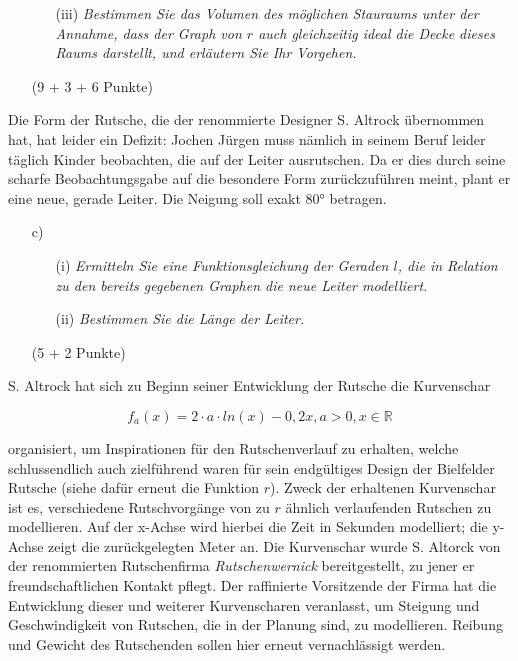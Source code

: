 \documentclass[ngerman, a4paper, 11pt]{article}
\begin{document}
\begin{enumerate}[resume]
    \item[]
        \begin{enumerate}[resume]
            \item[(iii)]
                \textit{Bestimmen Sie das Volumen des möglichen Stauraums unter der Annahme,
                dass der Graph von $r$ auch gleichzeitig ideal die Decke dieses Raums darstellt,
                und erläutern Sie Ihr Vorgehen.}
        \end{enumerate}
        \begin{flushright}
            (9 + 3 + 6 Punkte)
        \end{flushright}
\end{enumerate}

Die Form der Rutsche, die der renommierte Designer S. Altrock übernommen hat, hat leider ein Defizit:
Jochen Jürgen muss nämlich in seinem Beruf leider täglich Kinder beobachten, die auf der Leiter ausrutschen.
Da er dies durch seine scharfe Beobachtungsgabe auf die besondere Form zurückzuführen meint, plant er eine neue, gerade Leiter.
Die Neigung soll exakt 80° betragen.

\begin{enumerate}[resume]
    \item[c)]
        \begin{enumerate}
            \item[(i)]
                \textit{Ermitteln Sie eine Funktionsgleichung der Geraden $l$,
                die in Relation zu den bereits gegebenen Graphen die neue Leiter modelliert.}
            \item[(ii)]
                \textit{Bestimmen Sie die Länge der Leiter.}
        \end{enumerate}
        \begin{flushright}
            (5 + 2 Punkte)
        \end{flushright}
\end{enumerate}

S. Altrock hat sich zu Beginn seiner Entwicklung der Rutsche die Kurvenschar

$$f_{a}(x)=2\cdot a\cdot ln(x)-0,2x,a>0,x\in \mathbb{R}$$

organisiert, um Inspirationen für den Rutschenverlauf zu erhalten, welche schlussendlich auch zielführend waren für sein endgültiges Design der Bielfelder Rutsche (siehe dafür erneut die Funktion $r$). Zweck der erhaltenen Kurvenschar ist es, verschiedene Rutschvorgänge von zu $r$ ähnlich verlaufenden Rutschen zu modellieren. Auf der x-Achse wird hierbei die Zeit in Sekunden modelliert; die y-Achse zeigt die zurückgelegten Meter an. Die Kurvenschar wurde S. Altorck von der renommierten Rutschenfirma \textit{Rutschenwernick} bereitgestellt, zu jener er freundschaftlichen Kontakt pflegt. Der raffinierte Vorsitzende der Firma hat die Entwicklung dieser und weiterer Kurvenscharen veranlasst, um Steigung und Geschwindigkeit von Rutschen, die in der Planung sind, zu modellieren. Reibung und Gewicht des Rutschenden sollen hier erneut vernachlässigt werden.
\end{document}
